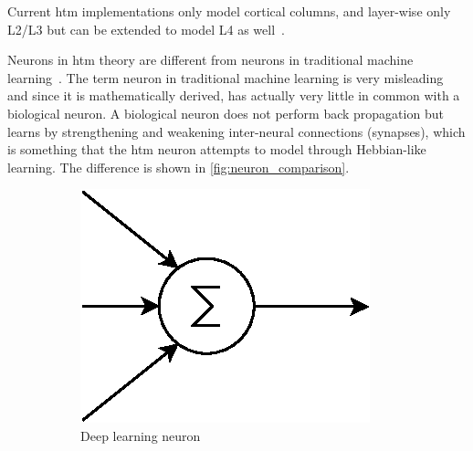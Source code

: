 Current \gls*{htm} implementations only model cortical columns, and layer-wise only L2/L3 but can be extended to model L4 as well~\cite{htm_l2_l3}.
\par
Neurons in \gls*{htm} theory are different from neurons in traditional machine learning~\cite{htm_neurons}. The term neuron in traditional machine learning is very misleading and since it is mathematically derived, has actually very little in common with a biological neuron. A biological neuron does not perform back propagation but learns by strengthening and weakening inter-neural connections (synapses), which is something that the \gls*{htm} neuron attempts to model through Hebbian-like learning. The difference is shown in \autoref{fig:neuron_comparison}.
\begin{figure}[htb]
    \centering
    \begin{subfigure}[b]{0.35\linewidth}
        \includegraphics[width=\linewidth]{resources/related_works/neuron_ml}
        \caption{Deep learning neuron}
    \end{subfigure}\\
    \begin{subfigure}[b]{0.35\linewidth}
        \centering
        \hspace*{1cm}

\end{subfigure}
\end{figure}
